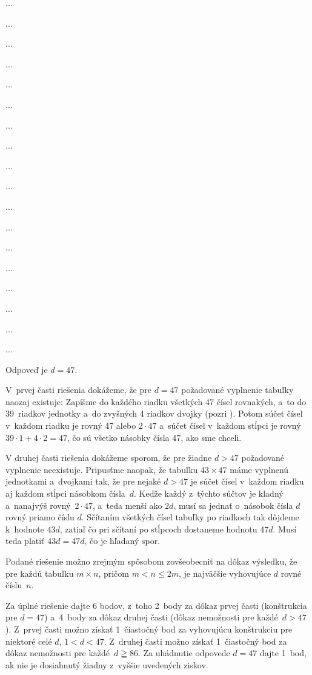 ﻿{%
...}

{%
...}

{%
...}

{%
...}

{%
...}

{%
...}

{%
...}

{%
...}

{%
...}

{%
...}

{%
...}

{%
...}

{%
...}

{%
...}

{%
...}

{%
...}

{%
...}

{%
...}

{%
Odpoveď je $d=47$.

V~prvej časti riešenia dokážeme, že pre $d=47$ požadované
vyplnenie tabuľky naozaj existuje:
Zapíšme do každého riadku všetkých 47 čísel rovnakých, a~to do 39~riadkov
jednotky a~do zvyšných 4 riadkov dvojky (pozri \obr).
Potom súčet čísel v~každom riadku je rovný 47 alebo $2\cdot 47$
a~súčet čísel v~každom stĺpci je rovný $39\cdot 1 + 4\cdot
2=47$, čo sú všetko násobky čísla 47, ako sme chceli.
%

V druhej časti riešenia dokážeme sporom, že pre žiadne $d>47$ požadované
vyplnenie neexistuje. Pripusťme naopak, že tabuľku $43\times 47$
máme vyplnenú jednotkami a~dvojkami tak, že pre nejaké $d>47$ je
súčet čísel v~každom riadku aj každom stĺpci násobkom čísla~$d$.
Keďže každý z~týchto súčtov je kladný a~nanajvýš rovný~$2\cdot47$,
a~teda menší ako $2d$, musí sa jednať o~násobok čísla $d$ rovný priamo číslu $d$.
Sčítaním všetkých čísel tabuľky po riadkoch tak dôjdeme k~hodnote $43d$,
zatiaľ čo pri sčítaní po stĺpcoch dostaneme hodnotu $47d$. Musí
teda platiť $43d=47d$, čo je hľadaný spor.

\Pozn
Podané riešenie možno zrejmým spôsobom zovšeobecniť
na dôkaz výsledku, že pre každú tabuľku $m\times n$, pričom
$m<n\le 2m$, je najväčšie vyhovujúce $d$ rovné číslu~$n$.

\schemaABC
Za úplné riešenie dajte 6 bodov, z~toho
2~body za dôkaz prvej časti (konštrukcia pre $d=47$)
a~4~body za dôkaz druhej časti (dôkaz nemožnosti pre každé~$d>47$).
Z~prvej časti možno získať 1~čiastočný bod za vyhovujúcu konštrukciu
pre niektoré celé $d$, $1<d<47$. Z~druhej časti možno získať
1~čiastočný bod za dôkaz nemožnosti pre každé~$d\geqq86$.
Za uhádnutie odpovede $d=47$ dajte 1~bod, ak nie je
dosiahnutý žiadny z~vyššie uvedených ziskov.
\endschema}

